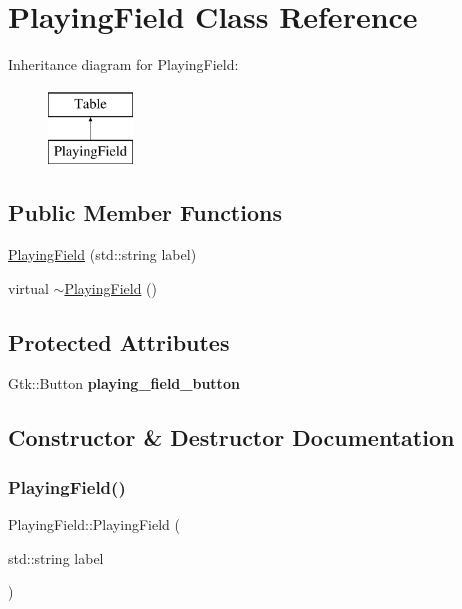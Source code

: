 \hypertarget{classPlayingField}{}\section{Playing\+Field Class Reference}
\label{classPlayingField}
Inheritance diagram for Playing\+Field\+:\begin{figure}[H]
\begin{center}
\leavevmode
\includegraphics[height=2.000000cm]{classPlayingField}
\end{center}
\end{figure}
\subsection*{Public Member Functions}
\begin{DoxyCompactItemize}
\item 
\mbox{\hyperlink{classPlayingField_aa5e9012b9e3846c42e37169af12e0f50}{Playing\+Field}} (std\+::string label)
\item 
virtual \mbox{\hyperlink{classPlayingField_ab88cf851b96f1e0af0b68f2e9c1146fc}{$\sim$\+Playing\+Field}} ()
\end{DoxyCompactItemize}
\subsection*{Protected Attributes}
\begin{DoxyCompactItemize}
\item 
\mbox{\label{classPlayingField_a00f46960edae9b79fb4aac3227415e70}} 
Gtk\+::\+Button {\bfseries playing\+\_\+field\+\_\+button}
\end{DoxyCompactItemize}


\subsection{Constructor \& Destructor Documentation}
\mbox{\label{classPlayingField_aa5e9012b9e3846c42e37169af12e0f50}} 
\subsubsection{\texorpdfstring{PlayingField()}{PlayingField()}}
{\footnotesize\ttfamily Playing\+Field\+::\+Playing\+Field (\begin{DoxyParamCaption}\item[{std\+::string}]{label }\end{DoxyParamCaption})}

